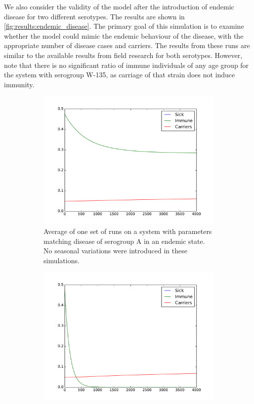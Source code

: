 \documentclass[10pt,a4paper]{article}
\begin{document}
We also consider the validity of the model after the introduction of endemic disease for two different serotypes. The results are shown in \cref{fig:results:endemic_disease}. The primary goal of this simulation is to examine whether the model could mimic the endemic behaviour of the disease, with the appropriate number of disease cases and carriers. The results from these runs are similar to the available results from field research for both serotypes. However, note that there is no significant ratio of immune individuals of any age group for the system with serogroup W-135, as carriage of that strain does not induce immunity. 

\begin{figure}[h]
	\centering
	\begin{subfigure}{0.45\textwidth}
		\includegraphics[width=\textwidth]{figures/plotted_disease_endemic_1pop_A.pdf}
		\caption{Average of one set of runs on a system with parameters matching disease of serogroup A in an endemic state. No seasonal variations were introduced in these simulations.} \label{fig:results:endemic_disease_A}
	\end{subfigure}
	\begin{subfigure}{0.45\textwidth}
		\includegraphics[width=\textwidth]{figures/plotted_disease_endemic_1pop_W135.pdf}

\end{subfigure}
\end{figure}
\end{document}
